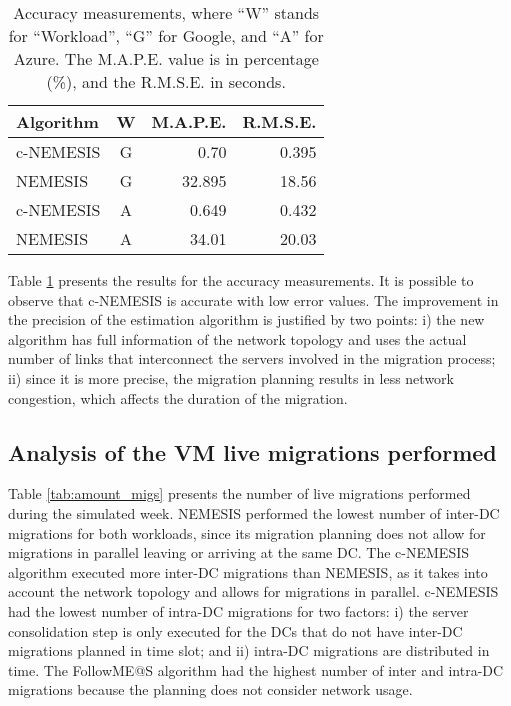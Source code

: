 \begin{table}[!htpb]
  \caption{Accuracy measurements, where ``W'' stands for ``Workload'', ``G'' for Google, and ``A'' for Azure. The M.A.P.E. value is in percentage (\%), and the R.M.S.E. in seconds. }\label{tab:accuracy} \centering
\begin{tabular}{|l|c|r|r|}
  \hline
  \textbf{Algorithm} & \textbf{W}  & \textbf{M.A.P.E.} & \textbf{R.M.S.E.}\\
  \hline
  c-NEMESIS  & G & 0.70  & 0.395 \\
  \hline
  NEMESIS & G & 32.895 & 18.56 \\
  \hline
  c-NEMESIS  & A & 0.649  & 0.432 \\
  \hline
  NEMESIS & A & 34.01 & 20.03 \\
  \hline
\end{tabular}
\end{table}



Table \ref{tab:accuracy} presents the results for the accuracy measurements. It is possible to observe that c-NEMESIS is accurate with low error values. The improvement in the precision of the estimation algorithm is justified by two points: i) the new algorithm has full information of the network topology and uses the actual number of links that interconnect the servers involved in the migration process; ii) since it is more precise, the migration planning  results in less network congestion, which affects the duration of the migration.


\subsection{Analysis of the VM live migrations performed}


Table \ref{tab:amount_migs} presents the number of live migrations performed during the simulated week. NEMESIS performed the lowest number of inter-DC migrations for both workloads, since its migration planning does not allow for migrations in parallel leaving or arriving at the same DC. The c-NEMESIS algorithm executed more inter-DC migrations than NEMESIS, as it takes into account the network topology and allows for migrations in parallel. c-NEMESIS had the lowest number of intra-DC migrations for two factors: i) the server consolidation step is only executed for the DCs that do not have inter-DC migrations planned in time slot; and ii) intra-DC migrations are distributed in time. The FollowME@S algorithm had the highest number of inter and intra-DC migrations because the planning does not consider network usage.

